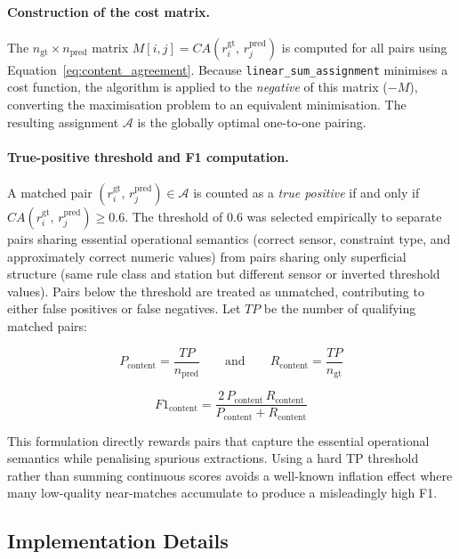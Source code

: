 ﻿\documentclass[11pt]{article}
\begin{document}
\paragraph{Construction of the cost matrix.}
The $n_{\text{gt}} \times n_{\text{pred}}$ matrix
$M[i,j] = CA(r^{\text{gt}}_i,\, r^{\text{pred}}_j)$
is computed for all pairs using Equation~\ref{eq:content_agreement}.
Because \texttt{linear\_sum\_assignment} minimises a cost function, the
algorithm is applied to the \emph{negative} of this matrix ($-M$), converting
the maximisation problem to an equivalent minimisation.
The resulting assignment $\mathcal{A}$ is the globally optimal one-to-one
pairing.

\paragraph{True-positive threshold and F1 computation.}
A matched pair $(r^{\text{gt}}_i,\, r^{\text{pred}}_j) \in \mathcal{A}$ is
counted as a \emph{true positive} if and only if
$CA(r^{\text{gt}}_i,\, r^{\text{pred}}_j) \geq 0.6$.
The threshold of $0.6$ was selected empirically to separate pairs sharing
essential operational semantics (correct sensor, constraint type, and
approximately correct numeric values) from pairs sharing only superficial
structure (same rule class and station but different sensor or inverted
threshold values).
Pairs below the threshold are treated as unmatched, contributing to either
false positives or false negatives.
Let $TP$ be the number of qualifying matched pairs:

$$P_{\text{content}} = \frac{TP}{n_{\text{pred}}}
\qquad \text{and} \qquad
R_{\text{content}} = \frac{TP}{n_{\text{gt}}}$$

$$F1_{\text{content}} = \frac{2\, P_{\text{content}}\, R_{\text{content}}}
                             {P_{\text{content}} + R_{\text{content}}}$$

This formulation directly rewards pairs that capture the essential operational
semantics while penalising spurious extractions.
Using a hard TP threshold rather than summing continuous scores avoids a
well-known inflation effect where many low-quality near-matches accumulate
to produce a misleadingly high F1.

\subsection{Implementation Details}
\label{sec:eval_impl}
\end{document}
